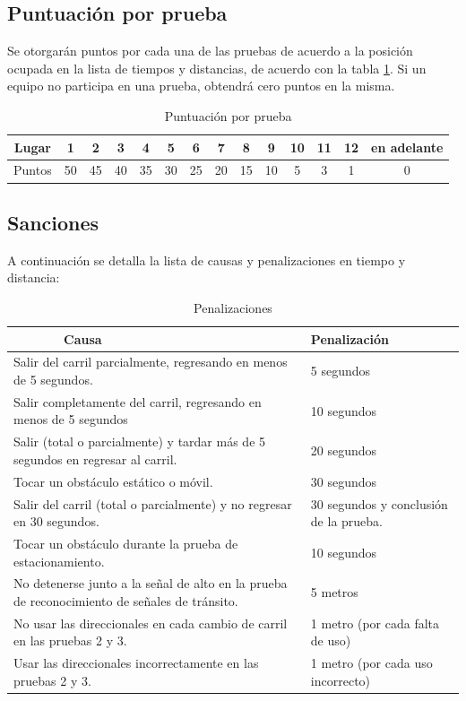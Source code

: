 \documentclass[letterpaper,12pt]{article}
\begin{document}
\subsection{Puntuación por prueba}
\label{sec:scoring}
Se otorgarán puntos por cada una de las pruebas de acuerdo a la posición ocupada en la lista de tiempos y distancias, de acuerdo con la tabla \ref{tab:Scoring}. Si un equipo no participa en una prueba, obtendrá cero puntos en la misma.
\[\]
\begin{table}[h!] 
  \centering
  \begin{tabular}{|c|c|c|c|c|c|c|c|c|c|c|c|c|c|}
    \hline
    Lugar &    1&   2&   3&   4&   5&   6&   7&   8&   9&10 & 11 & 12 & en adelante\\
    \hline
    Puntos & 50 & 45 & 40 & 35 & 30 & 25 & 20 & 15 & 10 & 5 & 3 & 1 & 0\\
    \hline
  \end{tabular}
  \caption{Puntuación por prueba}
  \label{tab:Scoring}
\end{table}


\subsection{Sanciones}
\label{sec:penalties}
A continuación se detalla la lista de causas y penalizaciones en tiempo y distancia:
\begin{table}[h!]
  \centering
  \begin{tabular}{|p{}|p{}|}
    \hline
    $\qquad\qquad$Causa & Penalización\\
    \hline
    Salir del carril parcialmente, regresando en menos de 5 segundos. & 5 segundos\\
    \hline
    Salir completamente del carril, regresando en menos de 5 segundos & 10 segundos\\
    \hline
    Salir (total o parcialmente) y tardar más de 5 segundos en regresar al carril. & 20 segundos\\
    \hline
    Tocar un obstáculo estático o móvil. & 30 segundos\\
    \hline
    Salir del carril (total o parcialmente) y no regresar en 30 segundos.  & 30 segundos y conclusión de la prueba.\\
    \hline
    Tocar un obstáculo durante la prueba de estacionamiento. & 10 segundos\\
    \hline
    No detenerse junto a la señal de alto en la prueba de reconocimiento de señales de tránsito. & 5 metros\\
    \hline
    No usar las direccionales en cada cambio de carril en las pruebas 2 y 3. & 1 metro (por cada falta de uso) \\
    \hline
    Usar las direccionales incorrectamente en las pruebas 2 y 3. & 1 metro (por cada uso incorrecto)\\
    \hline
  \end{tabular}
  \caption{Penalizaciones}
  \label{tab:Penalties}
\end{table}
\end{document}
